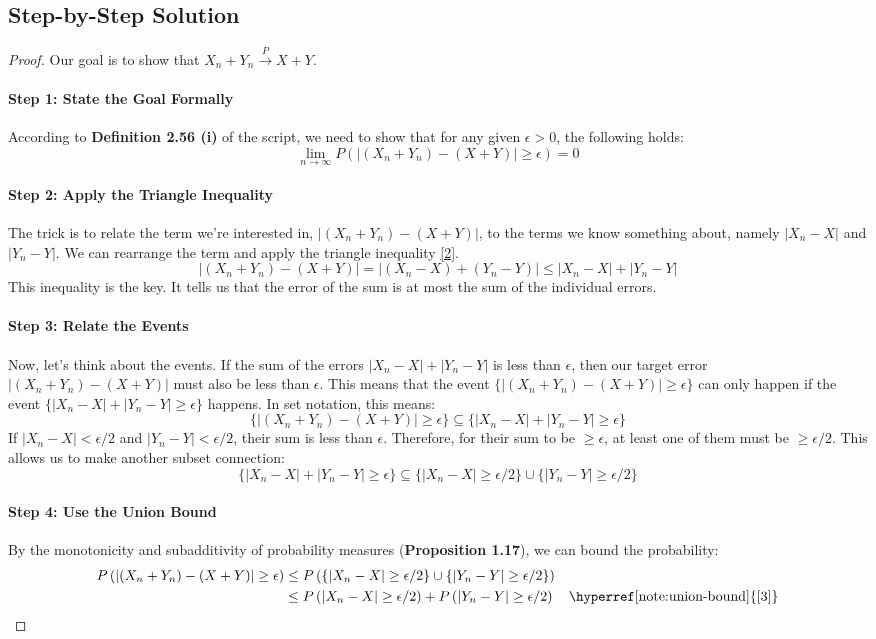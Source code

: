 \documentclass[11pt,a4paper]{article}
\theoremstyle{exercise}
\newcommand{\inDepthNote}[2]{\hyperref[#1]{[#2]}}
\begin{document}
\subsection*{Step-by-Step Solution}
\begin{proof}
Our goal is to show that $X_n + Y_n \xrightarrow{P} X + Y$.

\paragraph{Step 1: State the Goal Formally}
According to \textbf{Definition 2.56 (i)} of the script, we need to show that for any given $\epsilon > 0$, the following holds:
\[
\lim_{n \to \infty} P\left( |(X_n + Y_n) - (X + Y)| \ge \epsilon \right) = 0
\]

\paragraph{Step 2: Apply the Triangle Inequality}
The trick is to relate the term we're interested in, $|(X_n + Y_n) - (X + Y)|$, to the terms we know something about, namely $|X_n - X|$ and $|Y_n - Y|$. We can rearrange the term and apply the triangle inequality \inDepthNote{note:triangle}{2}.
\[
|(X_n + Y_n) - (X + Y)| = |(X_n - X) + (Y_n - Y)| \le |X_n - X| + |Y_n - Y|
\]
This inequality is the key. It tells us that the error of the sum is at most the sum of the individual errors.

\paragraph{Step 3: Relate the Events}
Now, let's think about the events. If the sum of the errors $|X_n - X| + |Y_n - Y|$ is less than $\epsilon$, then our target error $|(X_n + Y_n) - (X + Y)|$ must also be less than $\epsilon$. This means that the event $\{|(X_n + Y_n) - (X + Y)| \ge \epsilon\}$ can only happen if the event $\{|X_n - X| + |Y_n - Y| \ge \epsilon\}$ happens. In set notation, this means:
\[
\{|(X_n + Y_n) - (X + Y)| \ge \epsilon\} \subseteq \{|X_n - X| + |Y_n - Y| \ge \epsilon\}
\]
If $|X_n - X| < \epsilon/2$ and $|Y_n - Y| < \epsilon/2$, their sum is less than $\epsilon$. Therefore, for their sum to be $\ge \epsilon$, at least one of them must be $\ge \epsilon/2$. This allows us to make another subset connection:
\[
\{|X_n - X| + |Y_n - Y| \ge \epsilon\} \subseteq \{|X_n - X| \ge \epsilon/2\} \cup \{|Y_n - Y| \ge \epsilon/2\}
\]
\paragraph{Step 4: Use the Union Bound}
By the monotonicity and subadditivity of probability measures (\textbf{Proposition 1.17}), we can bound the probability:
\begin{align*}
P\left( |(X_n + Y_n) - (X + Y)| \ge \epsilon \right) &\le P\left( \{|X_n - X| \ge \epsilon/2\} \cup \{|Y_n - Y| \ge \epsilon/2\} \right) \\
&\le P\left( |X_n - X| \ge \epsilon/2 \right) + P\left( |Y_n - Y| \ge \epsilon/2 \right) \quad \text{\inDepthNote{note:union-bound}{3}}
\end{align*}


\end{proof}
\end{document}
